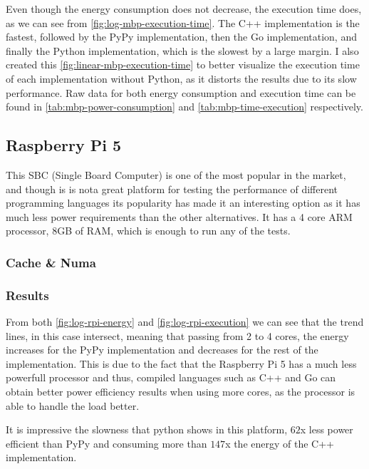 Even though the energy consumption does not decrease, the execution time does, as we can see from \autoref{fig:log-mbp-execution-time}. The C++ implementation is the fastest, followed by the PyPy implementation, then the Go implementation, and finally the Python implementation, which is the slowest by a large margin. I also created this \autoref{fig:linear-mbp-execution-time} to better visualize the execution time of each implementation without Python, as it distorts the results due to its slow performance. Raw data for both energy consumption and execution time can be found in \autoref{tab:mbp-power-consumption} and \autoref{tab:mbp-time-execution} respectively.


\subsection{Raspberry Pi 5}
This SBC (Single Board Computer) is one of the most popular in the market, and though is is nota great platform for testing the performance of different programming languages its popularity has made it an interesting option as it has much less power requirements than the other alternatives. It has a 4 core ARM processor, 8GB of RAM, which is enough to run any of the tests. 

\subsubsection{Cache \& Numa}


\subsubsection{Results}






From both \autoref{fig:log-rpi-energy} and \autoref{fig:log-rpi-execution} we can see that the trend lines, in this case intersect, meaning that passing from 2 to 4 cores, the energy increases for the PyPy implementation and decreases for the rest of the implementation. This is due to the fact that the Raspberry Pi 5 has a much less powerfull processor and thus, compiled languages such as C++ and Go can obtain better power efficiency results when using more cores, as the processor is able to handle the load better. 

It is impressive the slowness that python shows in this platform, $62$x less power efficient than PyPy and consuming more than $147$x the energy of the C++ implementation. 

